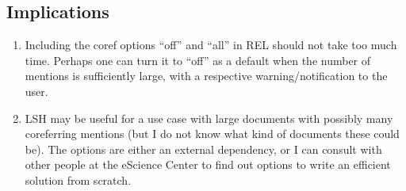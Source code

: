 \documentclass[a4paper,11pt]{article}
\numberwithin{equation}{section} %
\begin{document}
\subsection{Implications}

\begin{enumerate}
 \item Including the coref options ``off'' and ``all'' in REL should not take too much time. Perhaps one can turn it to ``off'' as a default when the number of mentions is sufficiently large, with a respective warning/notification to the user.
 \item LSH may be useful for a use case with large documents with possibly many coreferring mentions (but I do not know what kind of documents these could be). The options are either an external dependency, or I can consult with other people at the eScience Center to find out options to write an efficient solution from scratch.
\end{enumerate}









\end{document}
